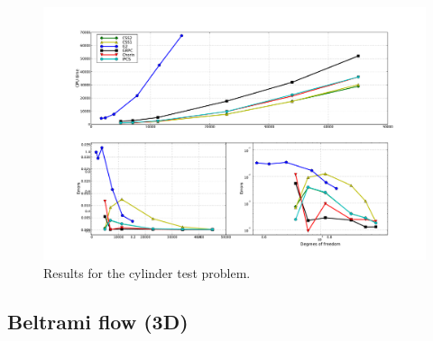 \begin{figure}
  \begin{center}
    \includegraphics[width=14cm]{chapters/kvs-1/pdf/new_cylinder_res.pdf}
    \caption{Results for the cylinder test problem.}
    \label{fig:cylinder_res}
  \end{center}
\end{figure}

\subsection{Beltrami flow (3D)}

